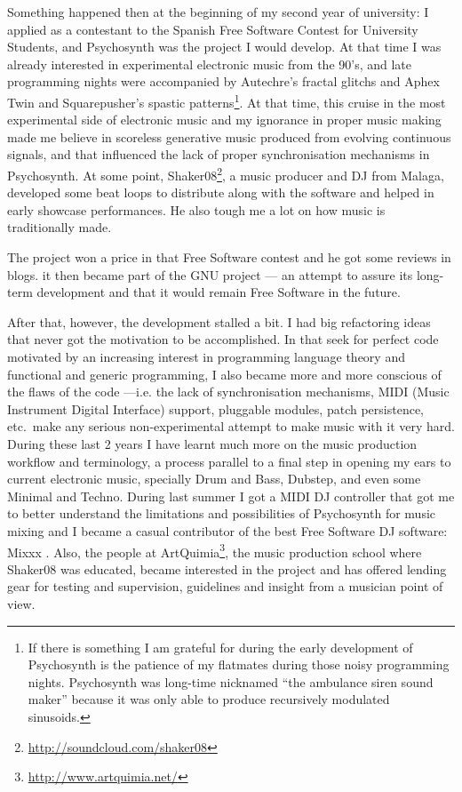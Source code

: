 Something happened then at the beginning of my second year of
university: I applied as a contestant to the Spanish Free Software
Contest for University Students, and Psychosynth was the project I
would develop. At that time I was already interested in experimental
electronic music from the 90's, and late programming nights were
accompanied by Autechre's fractal glitchs and Aphex Twin and
Squarepusher's spastic patterns\footnote{If there is something I am
  grateful for during the early development of Psychosynth is the
  patience of my flatmates during those noisy programming
  nights. Psychosynth was long-time nicknamed ``the ambulance siren
  sound maker'' because it was only able to produce recursively
  modulated sinusoids.}. At that time, this cruise in the most
experimental side of electronic music and my ignorance in proper music
making made me believe in scoreless generative music produced from
evolving continuous signals, and that influenced the lack of proper
synchronisation mechanisms in Psychosynth. At some point,
Shaker08\footnote{\url{http://soundcloud.com/shaker08}}, a music producer
and DJ from Malaga, developed some beat loops to distribute along with
the software and helped in early showcase performances. He also
tough me a lot on how music is traditionally made.

The project won a price in that Free Software contest and he got some
reviews in blogs. it then became part of the GNU project --- an
attempt to assure its long-term development and that it would remain
Free Software in the future.

After that, however, the development stalled a bit. I had big
refactoring ideas that never got the motivation to be accomplished. In
that seek for perfect code motivated by an increasing interest in
programming language theory and functional and generic programming, I
also became more and more conscious of the flaws of the code
---i.e. the lack of synchronisation mechanisms, MIDI (Music Instrument
Digital Interface) support, pluggable modules, patch persistence,
etc.\ make any serious non-experimental attempt to make music with it
very hard. During these last 2 years I have learnt much more on the
music production workflow and terminology, a process parallel to a
final step in opening my ears to current electronic music, specially
Drum and Bass, Dubstep, and even some Minimal and Techno. During last
summer I got a MIDI DJ controller that got me to better understand the
limitations and possibilities of Psychosynth for music mixing and I
became a casual contributor of the best Free Software DJ software:
Mixxx \cite{andersen03mixxx}. Also, the people at
ArtQuimia\footnote{\url{http://www.artquimia.net/}}, the music production
school where Shaker08 was educated, became interested in the project
and has offered lending gear for testing and supervision, guidelines
and insight from a musician point of view.


